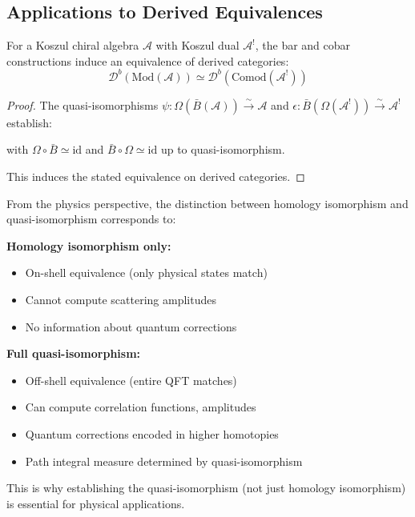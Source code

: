 \subsection{Applications to Derived Equivalences}

\begin{corollary}\label{cor:derived-equivalence-bar-cobar}
For a Koszul chiral algebra $\mathcal{A}$ with Koszul dual $\mathcal{A}^!$, the 
bar and cobar constructions induce an equivalence of derived categories:
$$\mathcal{D}^b(\text{Mod}(\mathcal{A})) \simeq \mathcal{D}^b(\text{Comod}(\mathcal{A}^!))$$
\end{corollary}

\begin{proof}
The quasi-isomorphisms $\psi: \Omega(\bar{B}(\mathcal{A})) \xrightarrow{\sim} \mathcal{A}$ 
and $\epsilon: \bar{B}(\Omega(\mathcal{A}^!)) \xrightarrow{\sim} \mathcal{A}^!$ 
establish:

\begin{center}
\end{center}

with $\Omega \circ \bar{B} \simeq \text{id}$ and $\bar{B} \circ \Omega \simeq \text{id}$ 
up to quasi-isomorphism.

This induces the stated equivalence on derived categories.
\end{proof}

\begin{remark}\label{rem:qi-matters-physics}
From the physics perspective, the distinction between homology isomorphism and 
quasi-isomorphism corresponds to:

\textbf{Homology isomorphism only:}
\begin{itemize}
\item On-shell equivalence (only physical states match)
\item Cannot compute scattering amplitudes
\item No information about quantum corrections
\end{itemize}

\textbf{Full quasi-isomorphism:}
\begin{itemize}
\item Off-shell equivalence (entire QFT matches)
\item Can compute correlation functions, amplitudes
\item Quantum corrections encoded in higher homotopies
\item Path integral measure determined by quasi-isomorphism
\end{itemize}

This is why establishing the quasi-isomorphism (not just homology isomorphism) is 
essential for physical applications.
\end{remark}

